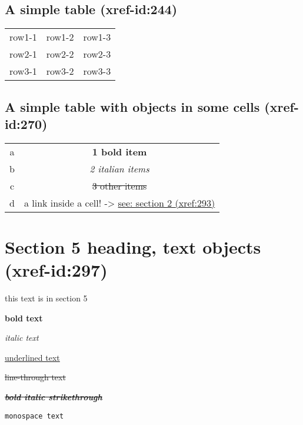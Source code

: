 \documentclass[11pt]{article}
\begin{document}
\subsection{A simple table   (xref-id:244)  }
 \label{obj-244}
 \label{obj-243}
\begin{tabular}{|c|c|c|}
\hline
 row1-1  &  row1-2  &  row1-3  \\
 row2-1  &  row2-2  &  row2-3  \\
 row3-1  &  row3-2  &  row3-3  \\
\hline
\end{tabular}
\vspace{\baselineskip}
\subsection{A simple table with objects in some cells   (xref-id:270)  }
 \label{obj-270}
 \label{obj-269}
\begin{tabular}{|c|c|}
\hline
 a  & \textbf{1 bold item} \\
 b  & \emph{2 italian items} \\
 c  & \sout{3 other items} \\
 d  & a link inside a cell! -\textgreater{} \hyperref[obj-42]{see: section 2 (xref:293)} \\
\hline
\end{tabular}
\vspace{\baselineskip}
\section{Section 5 heading, text objects   (xref-id:297)  }
 \label{obj-297}
 \label{obj-296}
this text is in section 5

\textbf{bold text}

\emph{italic text}

\underline{underlined text}

\sout{line-through text}

\textbf{\emph{\sout{bold italic strikethrough}}}

\vspace{\baselineskip}
\texttt{monospace text}
\end{document}
